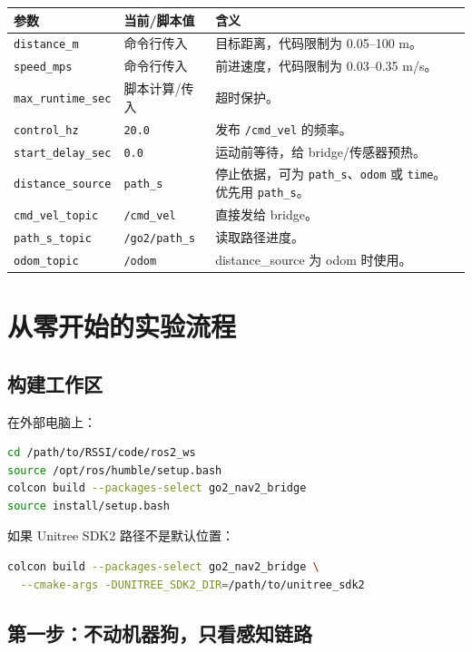 \documentclass[UTF8,11pt,a4paper,openany]{ctexrep}
\newcommand{\code}[1]{\nolinkurl{#1}}
\newcommand{\topic}[1]{\nolinkurl{#1}}
\newcommand{\param}[1]{\nolinkurl{#1}}
\begin{document}
\begin{longtable}{L{0.29\textwidth}L{0.20\textwidth}L{0.41\textwidth}}
\toprule
参数 & 当前/脚本值 & 含义 \\
\midrule
\param{distance_m} & 命令行传入 & 目标距离，代码限制为 0.05--100 m。 \\
\param{speed_mps} & 命令行传入 & 前进速度，代码限制为 0.03--0.35 m/s。 \\
\param{max_runtime_sec} & 脚本计算/传入 & 超时保护。 \\
\param{control_hz} & \code{20.0} & 发布 \topic{/cmd_vel} 的频率。 \\
\param{start_delay_sec} & \code{0.0} & 运动前等待，给 bridge/传感器预热。 \\
\param{distance_source} & \code{path_s} & 停止依据，可为 \code{path_s}、\code{odom} 或 \code{time}。优先用 \code{path_s}。 \\
\param{cmd_vel_topic} & \topic{/cmd_vel} & 直接发给 bridge。 \\
\param{path_s_topic} & \topic{/go2/path_s} & 读取路径进度。 \\
\param{odom_topic} & \topic{/odom} & distance\_source 为 odom 时使用。 \\
\bottomrule
\end{longtable}

\chapter{从零开始的实验流程}
\label{chap:experiments}

\section{构建工作区}

在外部电脑上：

\begin{lstlisting}[language=bash]
cd /path/to/RSSI/code/ros2_ws
source /opt/ros/humble/setup.bash
colcon build --packages-select go2_nav2_bridge
source install/setup.bash
\end{lstlisting}

如果 Unitree SDK2 路径不是默认位置：

\begin{lstlisting}[language=bash]
colcon build --packages-select go2_nav2_bridge \
  --cmake-args -DUNITREE_SDK2_DIR=/path/to/unitree_sdk2
\end{lstlisting}

\section{第一步：不动机器狗，只看感知链路}
\end{document}
